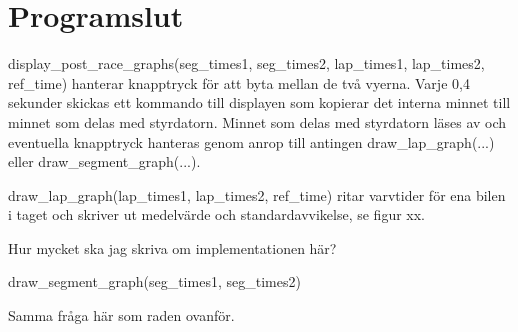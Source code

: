 \section{Programslut}

display\_post\_race\_graphs(seg\_times1, seg\_times2, lap\_times1, lap\_times2,
ref\_time) hanterar knapptryck för att byta mellan de två vyerna. Varje 0,4
sekunder skickas ett kommando till displayen som kopierar det interna minnet
till minnet som delas med styrdatorn. Minnet som delas med styrdatorn läses av
och eventuella knapptryck hanteras genom anrop till antingen
draw\_lap\_graph(...) eller draw\_segment\_graph(...).

draw\_lap\_graph(lap\_times1, lap\_times2, ref\_time) ritar varvtider för
ena bilen i taget och skriver ut medelvärde och standardavvikelse, se figur xx.

Hur mycket ska jag skriva om implementationen här?

draw\_segment\_graph(seg\_times1, seg\_times2)

Samma fråga här som raden ovanför.
